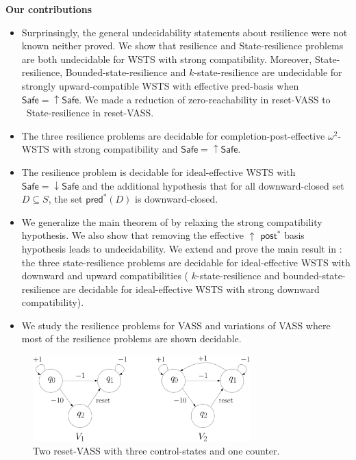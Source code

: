 \documentclass[runningheads]{llncs}
\newcommand{\pred}{\textsf{pred}}
\newcommand{\post}{\textsf{post}}
\newcommand{\Safe}{\textsf{Safe}}
\begin{document}
\noindent
{\bf Our contributions}
\begin{itemize}
\item Surprinsingly, the general undecidability statements about resilience were not known neither proved. We show that resilience and { State-resilience} problems are both undecidable for WSTS with strong compatibility. 
Moreover, {State-resilience},
{Bounded-state-resilience} and
{$k$-state-resilience}
are undecidable for strongly upward-compatible WSTS with effective pred-basis
when
$\Safe=\uparrow \Safe$. We made a reduction of zero-reachability in reset-VASS to {\ State-resilience} in reset-VASS.


\item The three resilience problems are decidable for completion-post-effective $\omega^2$-WSTS with strong compatibility and $\Safe = \uparrow \Safe$.


\item The resilience problem is decidable for ideal-effective WSTS with 
$\Safe=\downarrow \Safe$
and
the additional hypothesis that
for all downward-closed set $D \subseteq S$, the set $\pred^*(D)$ is downward-closed.
%

\item We generalize the main theorem of \cite{DBLP:journals/corr/abs-2108-00889,DBLP:conf/gg/Ozkan22} by relaxing the strong compatibility hypothesis.
We also show that removing the effective 
$\uparrow$ $\post^*$ basis hypothesis leads to undecidability. We extend and prove the main result in  \cite{DBLP:journals/corr/PrasadZ16} : the three state-resilience problems are decidable for ideal-effective WSTS with downward and upward compatibilities ({ $k$-state-resilience} and { bounded-state-resilience} are decidable for ideal-effective WSTS with strong downward compatibility).
%

\item We study the resilience problems for VASS and variations of VASS where most of the resilience problems are shown decidable.
\end{itemize}


 \begin{center}
	\begin{figure}
			\hspace{0.8cm}
\includegraphics[width=0.75\textwidth]{FigureCD}
	\caption{Two reset-VASS with three control-states and one counter.}
					\label{r-V}
	\end{figure}
\end{center}
\end{document}
